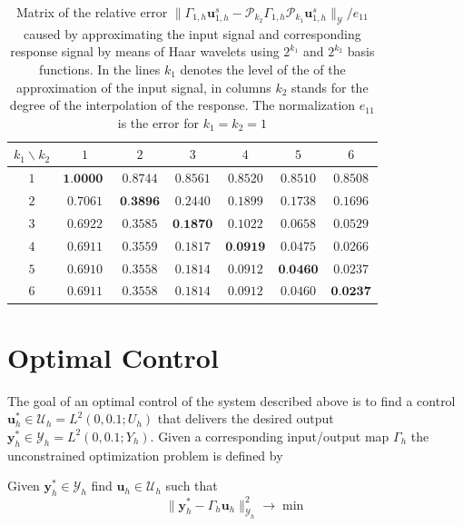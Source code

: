 \documentclass[a4paper,10pt,BCOR=15mm]{scrbook}
\providecommand{\norm}[1]{\lVert#1 \rVert}
\begin{document}
\begin{table}[htbp]
\centering
\begin{tabular}{c|cccccc}
 $k_{1} \backslash k_{2}$ & $1$ & $ 2$ & $3$ & $4$ & $5$ & $6$ \\ 
\hline
 $1$ & $    \textbf{1.0000 }$ & $    0.8744 $ & $    0.8561 $ & $    0.8520 $ & $    0.8510  $ & $   0.8508$ \\
  $2$&$   0.7061 $&$   \textbf{0.3896} $&$   0.2440  $&$  0.1899  $&$  0.1738  $&$  0.1696$ \\
  $3$&$  0.6922  $&$  0.3585  $&$  \textbf{0.1870}  $&$  0.1022  $&$  0.0658  $&$  0.0529$ \\
 $4$&$   0.6911 $&$   0.3559  $&$  0.1817  $&$  \textbf{0.0919}  $&$  0.0475 $&$   0.0266$ \\
 $5  $&$0.6910  $&$  0.3558 $&$   0.1814 $&$   0.0912  $&$  \textbf{0.0460}  $&$  0.0237$ \\
  $6 $&$  0.6911 $&$   0.3558  $&$  0.1814 $&$   0.0912 $&$   0.0460  $&$  \textbf{0.0237}$ \\

\end{tabular}
\caption{Matrix of the relative error $\norm{\Gamma _{1,h}\mathbf u^s_{1,h} - \mathscr P_{k_2}\Gamma _{1,h}\mathscr P_{k_1}\mathbf u^s_{1,h}}_{\mathcal Y}/e_{11}$ caused by approximating the input signal and corresponding response signal by means of Haar wavelets using $2^{k_1}$ and $2^{k_2}$ basis functions. In the lines $k_1$ denotes the level of the of the approximation of the input signal, in columns $k_2$ stands for the degree of the interpolation of the response. The normalization $e_{11}$ is the error for $k_1=k_2=1$}
\label{errma}
\end{table}

\section{Optimal Control}
The goal of an optimal control of the system described above is to find a control $\mathbf u_h^* \in \mathcal U_h = L^2(0,0.1;U_h)$ that delivers the desired output $\mathbf y_h^* \in \mathcal Y_h = L^2(0,0.1;Y_h)$. Given a corresponding input/output map $\Gamma_h$ the unconstrained optimization problem is defined by
\begin{prob}\label{optprob}
Given $\mathbf y_h^* \in \mathcal Y_h$ find $\mathbf u_h \in \mathcal U_h $ such that 
 \begin{equation*}
 \norm{\mathbf y_h^* - \Gamma_h \mathbf u_h}^2_{\mathcal Y_h} \rightarrow \min
\end{equation*}
\end{prob}
\end{document}

